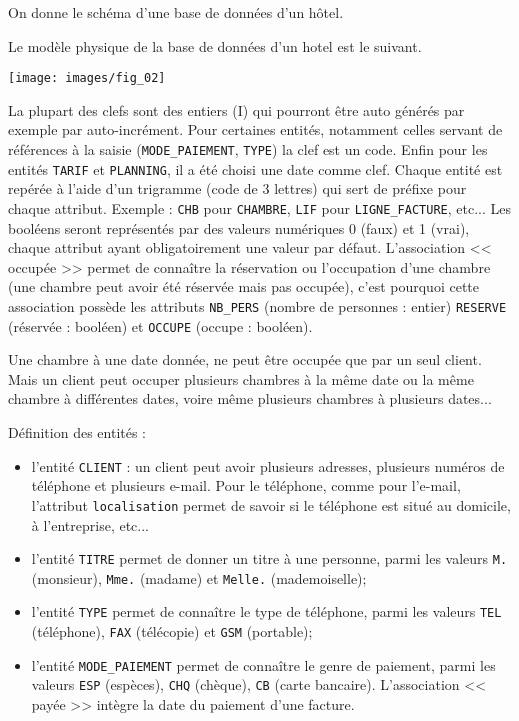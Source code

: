 On donne le schéma d’une base de données d’un hôtel.

Le modèle physique de la base de données d'un hotel est le suivant.

\begin{center}
\texttt{[image: images/fig\_02]}
\end{center}


La plupart des clefs sont des entiers (I) qui pourront être auto générés par exemple par auto-incrément. Pour certaines entités, notamment celles servant de références à la saisie (\texttt{MODE\_PAIEMENT}, \texttt{TYPE}) la clef est un code. Enfin pour les entités \texttt{TARIF} et \texttt{PLANNING}, il a été choisi une date comme clef. Chaque entité est repérée à l'aide d'un trigramme (code de 3 lettres) qui sert de préfixe pour chaque attribut. Exemple : \texttt{CHB} pour \texttt{CHAMBRE}, \texttt{LIF} pour \texttt{LIGNE\_FACTURE}, etc... Les booléens seront représentés par des valeurs numériques 0 (faux) et 1 (vrai), chaque attribut ayant obligatoirement une valeur par défaut. L'association << occupée >> permet de connaître la réservation ou l'occupation d'une chambre (une chambre peut avoir été réservée mais pas occupée), c'est pourquoi cette association possède les attributs \texttt{NB\_PERS} (nombre de personnes : entier) \texttt{RESERVE} (réservée : booléen) et \texttt{OCCUPE} (occupe : booléen). 

Une chambre à une date donnée, ne peut être occupée que par un seul client. Mais un client peut occuper plusieurs chambres à la même date ou la même chambre à différentes dates, voire même plusieurs chambres à plusieurs dates...


Définition des entités :
\begin{itemize}
\item l'entité \texttt{CLIENT} : un client peut avoir plusieurs adresses, plusieurs numéros de téléphone et plusieurs e-mail. Pour le téléphone, comme pour l'e-mail, l'attribut \texttt{localisation} permet de savoir si le téléphone est situé au domicile, à l'entreprise, etc...
\item l'entité \texttt{TITRE} permet de donner un titre à une personne, parmi les valeurs \texttt{M.} (monsieur), \texttt{Mme.} (madame) et \texttt{Melle.} (mademoiselle);
\item l'entité \texttt{TYPE} permet de connaître le type de téléphone, parmi les valeurs \texttt{TEL} (téléphone), \texttt{FAX} (télécopie) et \texttt{GSM} (portable);
\item l'entité \texttt{MODE\_PAIEMENT} permet de connaître le genre de paiement, parmi les valeurs \texttt{ESP} (espèces), \texttt{CHQ} (chèque), \texttt{CB} (carte bancaire). L'association << payée >> intègre la date du paiement d'une facture.
\end{itemize}

